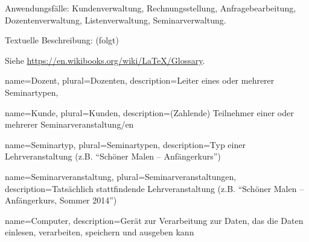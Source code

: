 \documentclass[parskip=full]{scrartcl}
\begin{document}
Anwendungsfälle: Kundenverwaltung, Rechnungsstellung, Anfragebearbeitung, Dozentenverwaltung, Listenverwaltung, Seminarverwaltung.

Textuelle Beschreibung: (folgt)



%
%
\printglossaries
Siehe \url{https://en.wikibooks.org/wiki/LaTeX/Glossary}.

%
%
{
  name=Dozent,
  plural=Dozenten,
  description={Leiter eines oder mehrerer Seminartypen},
}

{
  name=Kunde,
  plural=Kunden,
  description={(Zahlende) Teilnehmer einer oder mehrerer Seminarveranstaltung/en}
}

{
  name=Seminartyp,
  plural=Seminartypen,
  description={Typ einer Lehrveranstaltung (z.B. \enquote{Schöner Malen -- Anfängerkurs})}
}

{
  name=Seminarveranstaltung,
  plural=Seminarveranstaltungen,
  description={Tatsächlich stattfindende Lehrveranstaltung (z.B. \enquote{Schöner Malen -- Anfängerkurs, Sommer 2014})}
}

{
  name=Computer,
  description={Gerät zur Verarbeitung zur Daten, das die Daten einlesen, verarbeiten, speichern und ausgeben kann}
}
\end{document}
